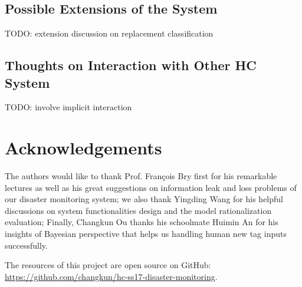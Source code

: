 \subsection{Possible Extensions of the System}

TODO: extension discussion on replacement classification

\subsection{Thoughts on Interaction with Other HC System}

TODO: involve implicit interaction

\section*{Acknowledgements}
The authors would like to thank Prof. Fran\c{c}ois Bry first for his remarkable lectures as well as
his great suggestions on information leak and loss problems of our disaster monitoring system;
we also thank Yingding Wang for his helpful discussions on system functionalities design 
and the model rationalization evaluation;
Finally, Changkun Ou thanks his schoolmate Huimin An for his insights of Bayesian perspective that
helps us handling human new tag inputs successfully.

The resources of this project are open source on GitHub: \\
\url{https://github.com/changkun/hc-ss17-disaster-monitoring}.